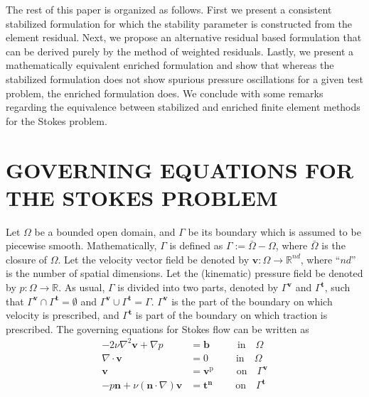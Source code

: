 \documentclass[11pt]{amsart}
\begin{document}
The rest of this paper is organized as follows.  First we present a consistent stabilized formulation for which the stability parameter is constructed from the element residual. Next, we propose an alternative residual based formulation that can be derived purely by the method of weighted residuals.  Lastly, we present a mathematically equivalent enriched formulation and show that whereas the stabilized formulation does not show spurious pressure oscillations for a given test problem, the enriched formulation does.  We conclude with some remarks regarding the equivalence between stabilized and enriched finite element methods for the Stokes problem.


 \section{GOVERNING EQUATIONS FOR THE STOKES PROBLEM}
  Let $\Omega$ be a bounded open domain, and $\Gamma$ be its boundary 
  which is assumed to be piecewise smooth. Mathematically, $\Gamma$ 
  is defined as $\Gamma := \bar{\Omega} - \Omega$, where $\bar{\Omega}$ 
  is the closure of $\Omega$. Let the velocity vector field be denoted by 
  $\boldsymbol{v} : \Omega \rightarrow \mathbb{R}^{nd}$, where ``$nd$'' 
  is the number of spatial dimensions. Let the (kinematic) pressure field 
  be denoted by $p:\Omega \rightarrow \mathbb{R}$. 
As usual, $\Gamma$ is divided into two parts, denoted by 
  $\Gamma^{\boldsymbol{v}}$ and $\Gamma^{\boldsymbol{t}}$, such 
  that $\Gamma^{\boldsymbol{v}} \cap \Gamma^{\boldsymbol{t}} =\emptyset$ 
  and $\Gamma^{\boldsymbol{v}} \cup \Gamma^{\boldsymbol{t}}=\Gamma$.  $\Gamma^{\boldsymbol{v}}$ is the part of the boundary 
  on which velocity is prescribed, and $\Gamma^{\boldsymbol{t}}$ 
  is part of the boundary on which traction is prescribed. 
  The governing equations for Stokes flow can be written as 
\begin{align}
    \label{Eqn:SNS_Equilibrium}
    -2\nu \nabla^2 \boldsymbol{v} + 
    \nabla p &= \boldsymbol{b} \qquad \; \;  \ \mbox{in}  \quad \Omega \\
\label{Eqn:SNS_Continuity}
    \nabla \cdot \boldsymbol{v} &= 0 \qquad \; \;   \ \mbox{in} \quad \Omega \\
\label{Eqn:SNS_VelocityBC}
    \boldsymbol{v} &= \boldsymbol{v}^{\mathrm{p}} 
    \qquad \; \mbox{on} \quad \Gamma^{\boldsymbol{v}} \\
\label{Eqn:SNS_TractionBC}
    -p \boldsymbol{n} + \nu (\boldsymbol{n} \cdot \nabla) \boldsymbol{v} &= 
    \boldsymbol{t}^{\boldsymbol{n}} \qquad \; \mbox{on} \quad \Gamma^{\boldsymbol{t}} 
\end{align}
\end{document}
